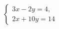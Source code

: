 \begin{ex}
	\begin{condition}
		\( \left\{
		\begin{array}{l}
			3x-2y=4,\\
			2x+10y=14
		\end{array}
		\right. \)
	\end{condition}
\end{ex}
